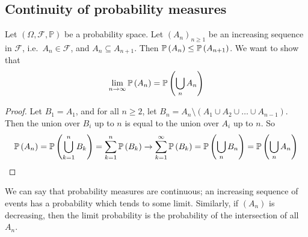 \subsection{Continuity of probability measures}
Let \((\Omega, \mathcal F, \mathbb P)\) be a probability space.
Let \((A_n)_{n \geq 1}\) be an increasing sequence in \(\mathcal F\), i.e.\ \(A_n \in \mathcal F\), and \(A_n \subseteq A_{n+1}\).
Then \(\mathbb{P}\left({A_n}\right) \leq \mathbb{P}\left({A_{n+1}}\right)\).
We want to show that
\[
	\lim_{n \to \infty}\mathbb{P}\left({A_n}\right) = \mathbb{P}\left({\bigcup_n A_n}\right)
\]
\begin{proof}
	Let \(B_1 = A_1\), and for all \(n \geq 2\), let \(B_n = A_n \setminus (A_1 \cup A_2 \cup \dots \cup A_{n-1})\).
	Then the union over \(B_i\) up to \(n\) is equal to the union over \(A_i\) up to \(n\).
	So
	\[
		\mathbb{P}\left({A_n}\right) = \mathbb{P}\left({\bigcup_{k=1}^n B_k}\right) = \sum_{k=1}^n \mathbb{P}\left({B_k}\right) \to \sum_{k=1}^\infty \mathbb{P}\left({B_k}\right) = \mathbb{P}\left({\bigcup_n B_n}\right) = \mathbb{P}\left({\bigcup_n A_n}\right)
	\]
\end{proof}
We can say that probability measures are continuous; an increasing sequence of events has a probability which tends to some limit.
Similarly, if \((A_n)\) is decreasing, then the limit probability is the probability of the intersection of all \(A_n\).

